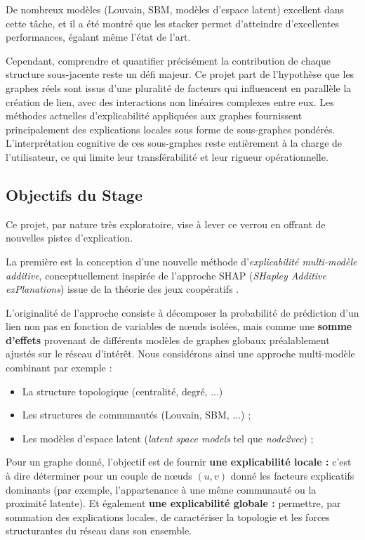 De nombreux modèles (Louvain\cite{louvain2008}, SBM\cite{sbm1983}, modèles d'espace latent\cite{deepwalk2014}\cite{node2vec2016}) excellent dans cette tâche, et il a été montré que les stacker permet d'atteindre d'excellentes performances\cite{01stackingLinkPred}, égalant même l'état de l'art.

Cependant, comprendre et quantifier précisément la contribution de chaque structure sous-jacente reste un défi majeur. Ce projet part de l'hypothèse que les graphes réels sont issus d'une pluralité de facteurs qui influencent en parallèle la création de lien, avec des interactions non linéaires complexes entre eux. Les méthodes actuelles d'explicabilité appliquées aux graphes fournissent principalement des explications locales sous forme de sous-graphes pondérés. L'interprétation cognitive de ces sous-graphes reste entièrement à la charge de l'utilisateur, ce qui limite leur transférabilité et leur rigueur opérationnelle.

\subsection{Objectifs du Stage}
Ce projet, par nature très exploratoire, vise à lever ce verrou en offrant de nouvelles pistes d'explication. 

La première est la conception d'une nouvelle méthode d'\textit{explicabilité multi-modèle additive}, conceptuellement inspirée de l'approche SHAP (\textit{SHapley Additive exPlanations}) issue de la théorie des jeux coopératifs \cite{lordShapleyOriginal_1953}. 

L'originalité de l'approche consiste à décomposer la probabilité de prédiction d'un lien non pas en fonction de variables de nœuds isolées, mais comme une \textbf{somme d'effets} provenant de différents modèles de graphes globaux préalablement ajustés sur le réseau d'intérêt. Nous considérons ainsi une approche multi-modèle combinant par exemple :
\begin{itemize}
    \item La structure topologique (centralité, degré, ...)
    \item Les structures de communautés (Louvain, SBM, ...) ;
    \item Les modèles d'espace latent (\textit{latent space models} tel que \textit{node2vec}) ;
\end{itemize}

Pour un graphe donné, l'objectif est de fournir \textbf{une explicabilité locale :} c'est à dire déterminer pour un couple de nœuds $(u, v)$ donné les facteurs explicatifs dominants (par exemple, l'appartenance à une même communauté ou la proximité latente). Et également \textbf{une explicabilité globale :} permettre, par sommation des explications locales, de caractériser la topologie et les forces structurantes du réseau dans son ensemble.

